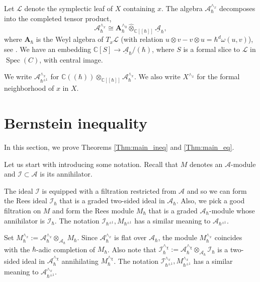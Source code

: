 \documentclass[12pt]{amsart}
\newcommand{\A}{\mathcal{A}}
\newcommand{\K}{\mathbb{C}}
\newcommand{\I}{\mathcal{I}}
\newcommand{\VA}{\operatorname{V}}
\newcommand{\Weyl}{\mathbf{A}}
\theoremstyle{definition}
\begin{document}

Let $\mathcal{L}$ denote the symplectic leaf of $X$ containing $x$.
The algebra $\A_\hbar^{\wedge_x}$ decomposes into the completed tensor product,
\begin{equation}\label{eq:decomp}\A_\hbar^{\wedge_x}\cong
\Weyl_\hbar^{\wedge_0}\widehat{\otimes}_{\K[[\hbar]]}\underline{\A}_\hbar,\end{equation} where $\Weyl_\hbar$
is the Weyl algebra of $T_x\mathcal{L}$ (with  relation $u\otimes v-v\otimes u=\hbar^{d}\omega(u,v)$),
see \cite{Losev_App}. We have an embedding $\K[S]\rightarrow \underline{\A}_\hbar/(\hbar)$,
where $S$ is a formal slice to $\mathcal{L}$ in $\operatorname{Spec}(C)$, with central image.


We write $\A_{\hbar^{\pm 1}}^{\wedge_x}$ for $\K((\hbar))\otimes_{\K[[\hbar]]}\A_\hbar^{\wedge_x}$.
We also write $X^{\wedge_x}$ for the formal neighborhood of $x$ in $X$.


\section{Bernstein inequality}\label{S_ineq}
In this section, we prove  Theorems \ref{Thm:main_ineq} and \ref{Thm:main_eq}.

Let us start with introducing some notation. Recall that $M$ denotes an $\A$-module
and $\I\subset \A$ is its annihilator.

The ideal $\I$ is equipped with a filtration restricted
from $\A$ and so we can form the Rees ideal $\I_\hbar$ that is a graded two-sided ideal in $\A_\hbar$.
Also, we pick a good filtration on $M$ and form the Rees module $M_\hbar$ that is a graded
$\A_\hbar$-module whose annihilator is $\I_\hbar$. The notation $\I_{\hbar^{\pm 1}},M_{\hbar^{\pm 1}}$
has a similar meaning to $\A_{\hbar^{\pm 1}}$.

Set  $M_\hbar^{\wedge_x}:=\A_\hbar^{\wedge_x}\otimes_{\A_\hbar}M_\hbar$. Since $\A_{\hbar}^{\wedge_x}$
is flat over $\A_\hbar$, the module $M_\hbar^{\wedge_x}$
coincides with the $\hbar$-adic completion of $M_\hbar$. Also note that
$\I_\hbar^{\wedge_\chi}:=\A_{\hbar}^{\wedge_\chi}\otimes_{\A_\hbar}\I_\hbar$ is a two-sided ideal in
$\A_\hbar^{\wedge_\chi}$ annihilating $M_\hbar^{\wedge_\chi}$.
The notation $\I_{\hbar^{\pm 1}}^{\wedge_x},M_{\hbar^{\pm 1}}^{\wedge_x}$
has a similar meaning  to $\A^{\wedge_x}_{\hbar^{\pm 1}}$.
\end{document}
